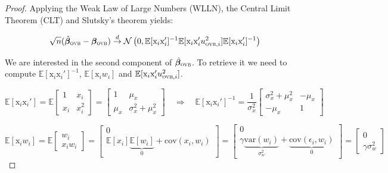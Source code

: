 \documentclass[usletter, 12pt]{article}
\begin{document}
\begin{proof}
				Applying the Weak Law of Large Numbers (WLLN), the Central Limit Theorem (CLT) and Slutsky's theorem yields:
				
				\begin{equation}\label{asympt_ovb}
					\sqrt{n}(\hat{\bm{\beta}}_{\textsc{ovb}} - \bm{\beta}_{\textsc{ovb}}) \overset{d}{\to} \mathcal{N}\left(0,  \mathbb{E}[\text{x}_{i}\text{x}_{i}']^{-1} \mathbb{E}[\text{x}_{i}\text{x}_{i}'u_{\textsc{ovb}, i}^{2}] \mathbb{E}[\text{x}_{i}\text{x}_{i}']^{-1}\right) 
				\end{equation}
				
				
				We are interested in the second component of $\hat{\bm{\beta}}_{\textsc{ovb}}$. To retrieve it we need to compute $\mathbb{E}[\text{x}_{i}\text{x}_{i}']^{-1}$, $ \mathbb{E}[\text{x}_{i} w_{i}] $ and $\mathbb{E}[\text{x}_{i}\text{x}_{i}'u_{\textsc{ovb}, i}^{2}]$.  
				
				\[ 
				\mathbb{E}[\text{x}_{i}\text{x}_i'] 
				= \mathbb{E} \begin{bmatrix}
					1 & x_{i}\\ 
					x_{i} & x_{i}^{2}
				\end{bmatrix} 
				=
				\begin{bmatrix}
					1 & \mu_{x}\\ 
					\mu_{x} & \sigma_{x}^{2} + \mu_{x}^2
				\end{bmatrix} 
				\quad \Rightarrow \quad
				     \mathbb{E}[\text{x}_{i}\text{x}_i']^{-1} = \dfrac{1}{\sigma_{x}^{2}} 
				     									\begin{bmatrix}
														 \sigma_{x}^{2} + \mu_{x}^2 & -\mu_{x}\\ 
														-\mu_{x} & 1
													\end{bmatrix} 
				\]
				
				\begin{equation*} 
            				\mathbb{E}[\text{x}_{i}w_i] = 
            				\mathbb{E}
            					\begin{bmatrix}
            						w_i\\ 
            						x_iw_i
            					\end{bmatrix} 
            				=
            				\begin{bmatrix}
            				    	0\\ 
            					\mathbb{E}[x_{i}]\underbrace{\mathbb{E}[w_{i}]}_{0} + \text{cov}(x_{i}, w_{i}) 
            				\end{bmatrix} 
            				= 
            				\begin{bmatrix}
            				    	0\\ 
            					\gamma  \underbrace{\text{var}(w_{i})}_{\sigma_{w}^{2}} + \underbrace{\text{cov}(\epsilon_{i}, w_{i})}_{0} 
            				\end{bmatrix} 
            				=
            				\begin{bmatrix}
            				    	0\\ 
            					\gamma \sigma_{w}^{2}
            				\end{bmatrix} 
				\end{equation*}
				

\end{proof}
\end{document}
